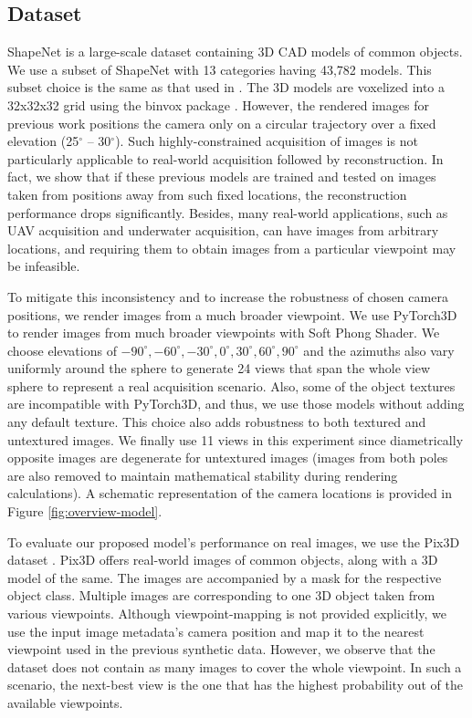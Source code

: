 \subsection{Dataset}
\label{sec:dataset}
ShapeNet \cite{shapenet} is a large-scale dataset containing 3D CAD models of common objects. We use a subset of ShapeNet with 13 categories having 43,782 models. This subset choice is the same as that used in \cite{3dr2n2, pix2vox, yang2018active}. The 3D models are voxelized into a 32x32x32 grid using the binvox package \cite{binvox, nooruddin03}. However, the rendered images for previous work \cite{pix2vox, 3dr2n2, yang2018active} positions the camera only on a circular trajectory over a fixed elevation (25$^\circ$ -- 30$^\circ$). Such highly-constrained acquisition of images is not particularly applicable to real-world acquisition followed by reconstruction. In fact, we show that if these previous models are trained and tested on images taken from positions away from such fixed locations, the reconstruction performance drops significantly. Besides, many real-world applications, such as UAV acquisition and underwater acquisition, can have images from arbitrary locations, and requiring them to obtain images from a particular viewpoint may be infeasible.

To mitigate this inconsistency and to increase the robustness of chosen camera positions, we render images from a much broader viewpoint. We use PyTorch3D \cite{pytorch3d} to render images from much broader viewpoints with Soft Phong Shader. We choose elevations of $-90^{\circ}, -60^{\circ}, -30^{\circ}, 0^{\circ}, 30^{\circ}, 60^{\circ}, 90^{\circ}$ and the azimuths also vary uniformly around the sphere to generate 24 views that span the whole view sphere to represent a real acquisition scenario. Also, some of the object textures are incompatible with PyTorch3D, and thus, we use those models without adding any default texture. This choice also adds robustness to both textured and untextured images. We finally use 11 views in this experiment since diametrically opposite images are degenerate for untextured images (images from both poles are also removed to maintain mathematical stability during rendering calculations). A schematic representation of the camera locations is provided in Figure \ref{fig:overview-model}.

To evaluate our proposed model's performance on real images, we use the Pix3D dataset \cite{pix3d}. Pix3D offers real-world images of common objects, along with a 3D model of the same. The images are accompanied by a mask for the respective object class. Multiple images are corresponding to one 3D object taken from various viewpoints. Although viewpoint-mapping is not provided explicitly, we use the input image metadata's camera position and map it to the nearest viewpoint used in the previous synthetic data. However, we observe that the dataset does not contain as many images to cover the whole viewpoint. In such a scenario, the next-best view is the one that has the highest probability out of the available viewpoints.

